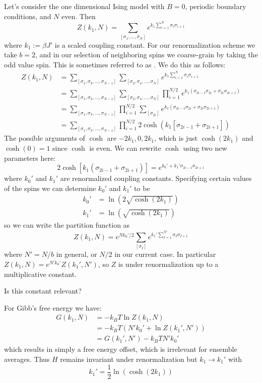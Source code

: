 \documentclass[12pt, a4paper, oneside, openright, titlepage]{book}
\begin{document}
Let's consider the one dimensional Ising model with $B = 0$, periodic boundary conditions, and $N$ even. Then $$Z(k_1,N) = \sum_{[\sigma_1,...,\sigma_N]}e^{k_1\sum_{i=1}^N\sigma_i\sigma_{i+1}}$$
where $k_1 := \beta J'$ is a scaled coupling constant. For our renormalization scheme we take $b = 2$, and in our selection of neighboring spins we coarse-grain by taking the odd value spin. This is sometimes referred to as . We do this as follows: \begin{align*}
    Z(k_1,N) &= \sum_{[\sigma_1,\sigma_3,...,\sigma_{N-1}]}\sum_{[\sigma_2,\sigma_4,...,\sigma_N]}e^{k_1\sum_{i=1}^N\sigma_i\sigma_{i+1}} \\
    &= \sum_{[\sigma_1,\sigma_3,...,\sigma_{N-1}]}\sum_{[\sigma_2,\sigma_4,...,\sigma_N]}\prod_{i=1}^{N/2}e^{k_1(\sigma_{2i-1}\sigma_{2i}+\sigma_{2i}\sigma_{2i+1})} \\
    &= \sum_{[\sigma_1,\sigma_3,...,\sigma_{N-1}]}\prod_{i=1}^{N/2}\sum_{[\sigma_{2i}]}e^{k_1(\sigma_{2i-1}\sigma_{2i}+\sigma_{2i}\sigma_{2i+1})} \\
    &= \sum_{[\sigma_1,\sigma_3,...,\sigma_{N-1}]}\prod_{i=1}^{N/2}2\cosh(k_1[\sigma_{2i-1}+\sigma_{2i+1}])
\end{align*}
The possible arguments of $\cosh$ are $-2k_1,0,2k_1$, which is just $\cosh(2k_1)$ and $\cosh(0) = 1$ since $\cosh$ is even. We can rewrite $\cosh$ using two new parameters here: \begin{equation*}
    2\cosh[k_1(\sigma_{2i-1}+\sigma_{2i+1})] = e^{k_0'+k_1'\sigma_{2i-1}\sigma_{2i+1}}
\end{equation*}
where $k_0'$ and $k_1'$ are renormalized coupling constants. Specifying certain values of the spins we can determine $k_0'$ and $k_1'$ to be \begin{align*}
    k_0' &= \ln(2\sqrt{\cosh(2k_1)}) \\
    k_1' &= \ln(\sqrt{\cosh(2k_1)})
\end{align*}
so we can write the partition function as \begin{equation*}
    Z(k_1,N) = e^{Nk_0'/2}\sum_{[\sigma_I]}e^{k_1'\sum_{I=1}^{N'}\sigma_I\sigma_{I+1}}
\end{equation*}
where $N' = N/b$ in general, or $N/2$ in our current case. In particular $Z(k_1,N) = e^{N'k_0'}Z(k_1',N')$, so $Z$ is  under renormalization up to a multiplicative constant.

\begin{qst}
    Is this constant relevant?
\end{qst}
For Gibb's free energy we have: \begin{align*}
    G(k_1,N) &= -k_BT\ln Z(k_1,N) \\
    &= -k_BT(N'k_0'+\ln Z(k_1',N')) \\
    &= G(k_1',N') - k_BTN'k_0'
\end{align*}
which results in simply a free energy offset, which is irrelevant for ensemble averages. Thus $H$ remains invariant under renormalization but $k_1\rightarrow k_1'$ with $$\boxed{k_1' = \frac{1}{2}\ln(\cosh(2k_1))}$$
\end{document}
